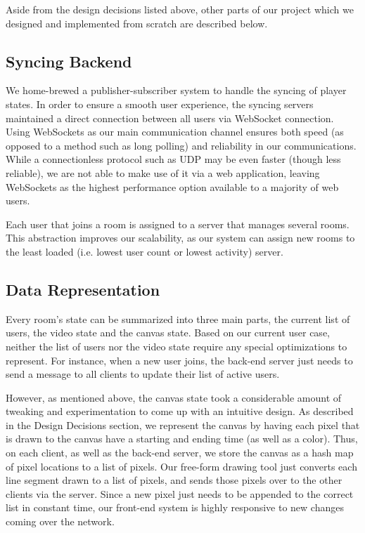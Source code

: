 \documentclass[conference]{IEEEtran}
\begin{document}
    Aside from the design decisions listed above, other parts of our project which we designed and implemented from scratch are described below.

\subsection{Syncing Backend}

    We home-brewed a publisher-subscriber system to handle the syncing of player states. In order to ensure a smooth user experience, the syncing servers maintained a direct connection between all users via WebSocket connection. Using WebSockets as our main communication channel ensures both speed (as opposed to a method such as long polling) and reliability in our communications. While a connectionless protocol such as UDP may be even faster (though less reliable), we are not able to make use of it via a web application, leaving WebSockets as the highest performance option available to a majority of web users.

    Each user that joins a room is assigned to a server that manages several rooms. This abstraction improves our scalability, as our system can assign new rooms to the least loaded (i.e. lowest user count or lowest activity) server.


\subsection{Data Representation}

    Every room's state can be summarized into three main parts, the current list of users, the video state and the canvas state. Based on our current user case, neither the list of users nor the video state require any special optimizations to represent. For instance, when a new user joins, the back-end server just needs to send a message to all clients to update their list of active users.

    However, as mentioned above, the canvas state took a considerable amount of tweaking and experimentation to come up with an intuitive design. As described in the Design Decisions section, we represent the canvas by having each pixel that is drawn to the canvas have a starting and ending time (as well as a color). Thus, on each client, as well as the back-end server, we store the canvas as a hash map of pixel locations to a list of pixels. Our free-form drawing tool just converts each line segment drawn to a list of pixels, and sends those pixels over to the other clients via the server. Since a new pixel just needs to be appended to the correct list in constant time, our front-end system is highly responsive to new changes coming over the network.
\end{document}
